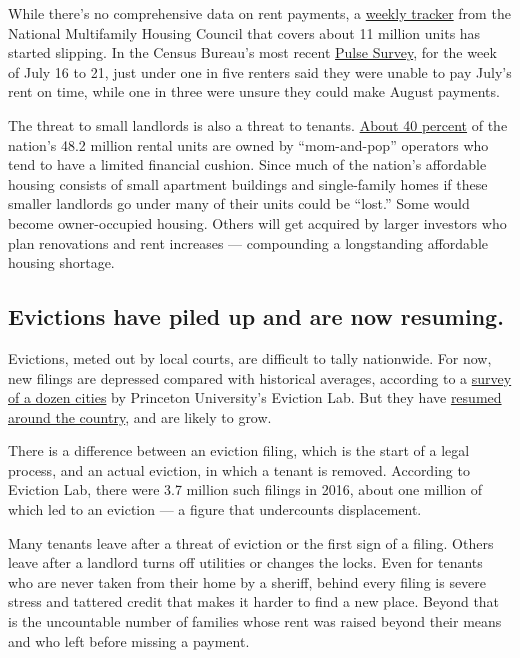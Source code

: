 While there's no comprehensive data on rent payments, a
\href{https://www.nmhc.org/research-insight/nmhc-rent-payment-tracker/}{weekly
tracker} from the National Multifamily Housing Council that covers about
11 million units has started slipping. In the Census Bureau's most
recent
\href{https://www.census.gov/data/tables/2020/demo/hhp/hhp12.html}{Pulse
Survey}, for the week of July 16 to 21, just under one in five renters
said they were unable to pay July's rent on time, while one in three
were unsure they could make August payments.

The threat to small landlords is also a threat to tenants.
\href{https://www.hud.gov/press/press_releases_media_advisories/HUD_No_20_071}{About
40 percent} of the nation's 48.2 million rental units are owned by
``mom-and-pop'' operators who tend to have a limited financial cushion.
Since much of the nation's affordable housing consists of small
apartment buildings and single-family homes if these smaller landlords
go under many of their units could be ``lost.'' Some would become
owner-occupied housing. Others will get acquired by larger investors who
plan renovations and rent increases --- compounding a longstanding
affordable housing shortage.

\hypertarget{evictions-have-piled-up-and-are-now-resuming}{%
\subsection{Evictions have piled up and are now
resuming.}\label{evictions-have-piled-up-and-are-now-resuming}}

Evictions, meted out by local courts, are difficult to tally nationwide.
For now, new filings are depressed compared with historical averages,
according to a \href{https://evictionlab.org/eviction-tracking/}{survey
of a dozen cities} by Princeton University's Eviction Lab. But they have
\href{https://www.nytimes.com/2020/07/23/business/evictions-moratorium-cares-act.html}{resumed
around the country}, and are likely to grow.

There is a difference between an eviction filing, which is the start of
a legal process, and an actual eviction, in which a tenant is removed.
According to Eviction Lab, there were 3.7 million such filings in 2016,
about one million of which led to an eviction --- a figure that
undercounts displacement.

Many tenants leave after a threat of eviction or the first sign of a
filing. Others leave after a landlord turns off utilities or changes the
locks. Even for tenants who are never taken from their home by a
sheriff, behind every filing is severe stress and tattered credit that
makes it harder to find a new place. Beyond that is the uncountable
number of families whose rent was raised beyond their means and who left
before missing a payment.

